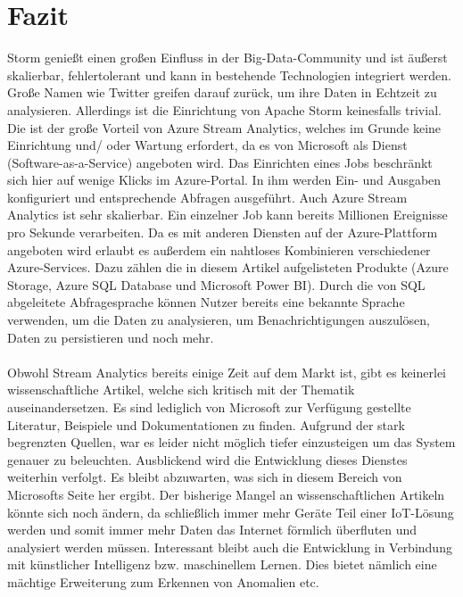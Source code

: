 \section{Fazit}
Storm genießt einen großen Einfluss in der Big-Data-Community und ist äußerst skalierbar, fehlertolerant und kann in bestehende Technologien integriert werden. Große Namen wie Twitter greifen darauf zurück, um ihre Daten in Echtzeit zu analysieren. Allerdings ist die Einrichtung von Apache Storm keinesfalls trivial. Die ist der große Vorteil von Azure Stream Analytics, welches im Grunde keine Einrichtung und/ oder Wartung erfordert, da es von Microsoft als Dienst (Software-as-a-Service) angeboten wird. Das Einrichten eines Jobs beschränkt sich hier auf wenige Klicks im Azure-Portal. In ihm werden Ein- und Ausgaben konfiguriert und entsprechende Abfragen ausgeführt. Auch Azure Stream Analytics ist sehr skalierbar. Ein einzelner Job kann bereits Millionen Ereignisse pro Sekunde verarbeiten. Da es mit anderen Diensten auf der Azure-Plattform angeboten wird erlaubt es außerdem ein nahtloses Kombinieren verschiedener Azure-Services. Dazu zählen die in diesem Artikel aufgelisteten Produkte (Azure Storage, Azure SQL Database und Microsoft Power BI). Durch die von SQL abgeleitete Abfragesprache können Nutzer bereits eine bekannte Sprache verwenden, um die Daten zu analysieren, um Benachrichtigungen auszulösen, Daten zu persistieren und noch mehr.\\ \\
Obwohl Stream Analytics bereits einige Zeit auf dem Markt ist, gibt es keinerlei wissenschaftliche Artikel, welche sich kritisch mit der Thematik auseinandersetzen. Es sind lediglich von Microsoft zur Verfügung gestellte Literatur, Beispiele und Dokumentationen zu finden. Aufgrund der stark begrenzten Quellen, war es leider nicht möglich tiefer einzusteigen um das System genauer zu beleuchten. Ausblickend wird die Entwicklung dieses Dienstes weiterhin verfolgt. Es bleibt abzuwarten, was sich in diesem Bereich von Microsofts Seite her ergibt. Der bisherige Mangel an wissenschaftlichen Artikeln könnte sich noch ändern, da schließlich immer mehr Geräte Teil einer IoT-Lösung werden und somit immer mehr Daten das Internet förmlich überfluten und analysiert werden müssen. Interessant bleibt auch die Entwicklung in Verbindung mit künstlicher Intelligenz bzw. maschinellem Lernen. Dies bietet nämlich eine mächtige Erweiterung zum Erkennen von Anomalien etc.




\ifCLASSOPTIONcaptionsoff
  \newpage
\fi